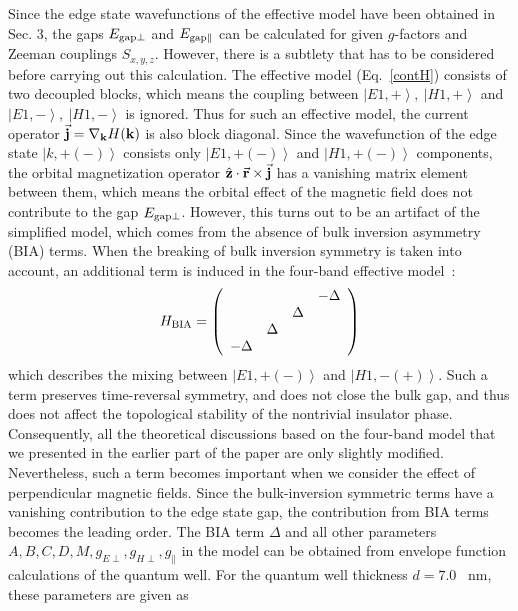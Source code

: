 \documentclass{article}
\begin{document}
Since the edge state wavefunctions of the effective model have been
obtained in Sec. 3, the gaps $E_{\rm gap\perp}$ and $E_{\rm
gap\parallel}$ can be calculated for given $g$-factors and Zeeman
couplings $S_{x,y,z}$. However, there is a subtlety that has to be
considered before carrying out this calculation. The effective model
(Eq.~\ref{contH}) consists of two decoupled blocks, which means the
coupling between $\left|E1,+\right\rangle,~\left|H1,+\right\rangle$
and $\left|E1,-\right\rangle,~\left|H1,-\right\rangle$ is ignored.
Thus for such an effective model, the current operator $\vec{\bf
j}=\nabla_{\bf k}H({\bf k})$ is also block diagonal. Since the
wavefunction of the edge state $\left|k,+(-)\right\rangle$ consists
only $\left|E1,+(-)\right\rangle$ and $\left|H1,+(-)\right\rangle$
components, the orbital magnetization operator $\hat{\bf
z}\cdot\vec{\bf r}\times{\vec{\bf j}}$ has a vanishing matrix
element between them, which means the orbital effect of the magnetic
field does not contribute to the gap $E_{\rm gap\perp}$. However,
this turns out to be an artifact of the simplified model, which
comes from the absence of bulk inversion asymmetry (BIA) terms. When
the breaking of bulk inversion symmetry is taken into account, an
additional term is induced in the four-band effective
model~\cite{hughes2007}:
\begin{eqnarray}
H_{\rm
BIA}=\left(\begin{array}{cccc}&&&-\Delta\\&&\Delta&\\&\Delta&&\\-\Delta&&&\end{array}\right)
\end{eqnarray}
which describes the mixing between $\left|E1,+(-)\right\rangle$
and $\left|H1,-(+)\right\rangle$. Such a term preserves
time-reversal symmetry, and does not close the bulk gap, and thus
does not affect the topological stability of the nontrivial
insulator phase. Consequently, all the theoretical discussions
based on the four-band model that we presented in the earlier part
of the paper are only slightly modified. Nevertheless, such a term
becomes important when we consider the effect of perpendicular
magnetic fields. Since the bulk-inversion symmetric terms have a
vanishing contribution to the edge state gap, the contribution
from BIA terms becomes the leading order. The BIA term $\Delta$
and all other parameters
$A,B,C,D,M,g_{E\perp},g_{H\perp},g_{\parallel}$ in the model can
be obtained from envelope function calculations of the quantum
well\cite{hughes2007}. For the quantum well thickness $d=7.0$~ nm,
these parameters are given as
\end{document}
